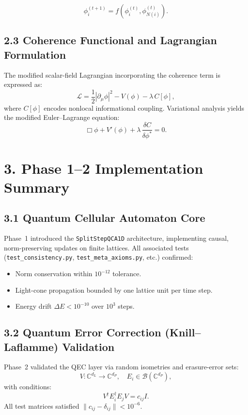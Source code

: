 \documentclass[11pt]{article}
\begin{document}
\[
\phi^{(t+1)}_i = f(\phi^{(t)}_i, \phi^{(t)}_{N(i)}).
\]

\subsection*{2.3 Coherence Functional and Lagrangian Formulation}

The modified scalar-field Lagrangian incorporating the coherence term is expressed as:
\[
\mathcal{L} = \frac{1}{2} |\partial_\mu \phi|^2 - V(\phi) - \lambda\, C[\phi],
\]
where \( C[\phi] \) encodes nonlocal informational coupling. Variational analysis yields the modified Euler–Lagrange equation:
\[
\Box \phi + V'(\phi) + \lambda\, \frac{\delta C}{\delta \phi^*} = 0.
\]

\section{3. Phase 1–2 Implementation Summary}

\subsection*{3.1 Quantum Cellular Automaton Core}

Phase~1 introduced the \texttt{SplitStepQCA1D} architecture, implementing causal, norm-preserving updates on finite lattices. All associated tests (\texttt{test\_consistency.py}, \texttt{test\_meta\_axioms.py}, etc.) confirmed:
\begin{itemize}
    \item Norm conservation within \( 10^{-12} \) tolerance.
    \item Light-cone propagation bounded by one lattice unit per time step.
    \item Energy drift $\Delta E < 10^{-10}$ over $10^3$ steps.
\end{itemize}

\subsection*{3.2 Quantum Error Correction (Knill–Laflamme) Validation}

Phase~2 validated the QEC layer via random isometries and erasure-error sets:
\[
V: \mathbb{C}^{d_L} \to \mathbb{C}^{d_P}, \quad E_i \in \mathcal{B}(\mathbb{C}^{d_P}),
\]
with conditions:
\[
V^\dagger E_i^\dagger E_j V = c_{ij} I.
\]
All test matrices satisfied \( \|c_{ij} - \delta_{ij}\| < 10^{-6} \).
\end{document}
